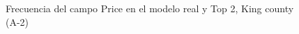 \begin{figure}[H]
    \centering
    
    \caption{Frecuencia del campo Price en el modelo real y Top 2, King county (A-2)}
    \label{frecuency-top2-price}
\end{figure}